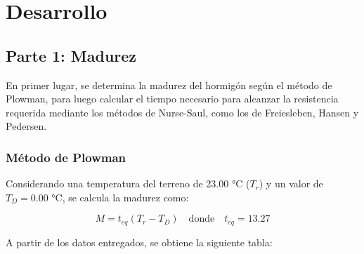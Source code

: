 \section{Desarrollo}

\subsection*{Parte 1: Madurez}

En primer lugar, se determina la madurez del hormigón según el método de Plowman, para luego calcular el tiempo necesario para alcanzar la resistencia requerida mediante los métodos de Nurse-Saul, como los de Freiesleben, Hansen y Pedersen.

\subsubsection*{Método de Plowman}

Considerando una temperatura del terreno de 23.00 °C ($T_r$) y un valor de $T_D = 0.00$ °C, se calcula la madurez como:

\begin{equation}
    M = t_{eq} (T_r - T_D) \quad \text{donde} \quad t_{eq} = 13.27
\end{equation}

A partir de los datos entregados, se obtiene la siguiente tabla:

